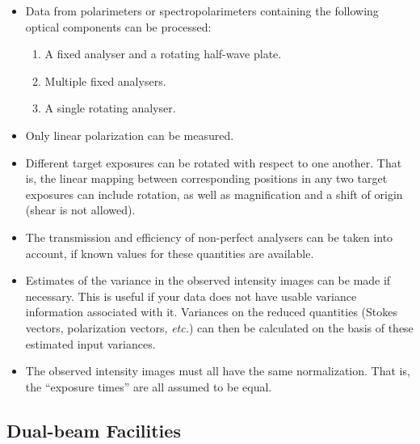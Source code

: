 \documentclass[twoside,11pt]{article}
\renewcommand{\_}{\texttt{\symbol{95}}}
\begin{document}
\begin{itemize}

\item Data from polarimeters or spectropolarimeters containing the following 
optical components can be processed:

\begin{enumerate}
\item A fixed analyser and a rotating half-wave plate.
\item Multiple fixed analysers.
\item A single rotating analyser.
\end{enumerate}

\item Only linear polarization can be measured. 

\item Different target exposures can be rotated with respect to one
another. That is, the linear mapping between corresponding positions in 
any two target 
exposures can include rotation, as well as magnification and a shift of 
origin (shear is not allowed).

\item The transmission and efficiency of non-perfect analysers can be
taken into account, if known values for these quantities are available.

\item Estimates of the variance in the observed intensity images can be made 
if necessary. This is useful if your data does not have usable variance
information associated with it. Variances on the reduced quantities
(Stokes vectors, polarization vectors, \emph{etc.}) can then be calculated 
on the basis of these estimated input variances.

\item The observed intensity images must all have the same normalization.
That is, the ``exposure times'' are all assumed to be equal.

\end{itemize}

\subsection{Dual-beam Facilities}
\end{document}
